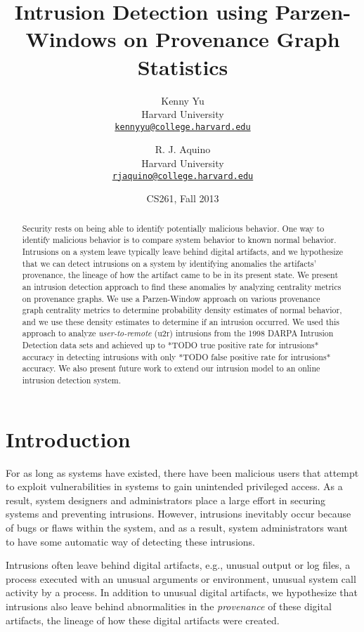 \documentclass[10pt,twocolumn]{article}
\title{{\bf Intrusion Detection using Parzen-Windows on Provenance Graph Statistics}}
\author{
    Kenny Yu\\
    Harvard University\\
    \href{mailto:kennyyu@college.harvard.edu}{\texttt{kennyyu@college.harvard.edu}}
  \and
    R. J. Aquino\\
    Harvard University\\
    \href{mailto:rjaquino@college.harvard.edu}{\texttt{rjaquino@college.harvard.edu}}
}
\date{CS261, Fall 2013}
\begin{document}
\maketitle

%

\begin{abstract}
Security rests on being able to identify potentially malicious behavior.
One way to identify malicious behavior is to compare system behavior to known normal behavior.
Intrusions on a system leave typically leave behind digital artifacts, and we hypothesize
that we can detect intrusions on a system by identifying anomalies the artifacts' provenance, the lineage of how
the artifact came to be in its present state.
We present an intrusion detection approach to find these anomalies by analyzing centrality metrics
on provenance graphs. We use a Parzen-Window approach \cite{parzen} on various provenance graph centrality metrics \cite{clustering}
to determine probability density estimates of normal behavior, and we use these density estimates to 
determine if an intrusion occurred. We used this approach to analyze {\em user-to-remote} (u2r) intrusions 
from the 1998 DARPA Intrusion Detection data sets \cite{darpa} and 
achieved up to *TODO true positive rate for intrusions* accuracy in detecting
intrusions with only *TODO false positive rate for intrusions* accuracy. We also present future work
to extend our intrusion model to an online intrusion detection system.

\end{abstract}

%

\section{Introduction}

For as long as systems have existed, there have been malicious users that attempt to exploit vulnerabilities
in systems to gain unintended privileged access. As a result, system designers and 
administrators place a large effort in securing systems and preventing intrusions. However, intrusions
inevitably occur because of bugs or flaws within the system, and as a result, system administrators want to
have some automatic way of detecting these intrusions. 

Intrusions often leave behind digital artifacts, e.g., unusual output or log files, a process executed
with an unusual arguments or environment, unusual system call activity by a process. In addition to
unusual digital artifacts, we hypothesize that
intrusions also leave behind abnormalities
in the {\em provenance} of these digital artifacts, the lineage of how these digital artifacts were created.
\end{document}
